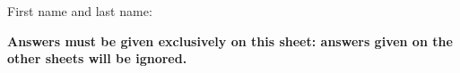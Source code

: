 \documentclass[a4paper,12pt]{article}
\begin{document}
{{\begin{minipage}[b]{6.5cm}
{{\begin{minipage}{.9\linewidth}
      First name and last name:
      
      
      \vspace*{.5cm}\dotfill
      \vspace*{0.5mm}
    \end{minipage}
  }}\hfill\vspace{5ex}\end{minipage}\hspace*{\fill}
}

\begin{center}
\bf\Large Answers must be given exclusively on this sheet:
answers given on the other sheets will be ignored.
\end{center}


\AMCform


\clearpage

}
\end{document}
